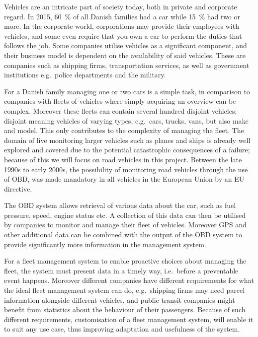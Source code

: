 Vehicles are an intricate part of society today, both in private and corporate regard.
In 2015, 60~\% of all Danish families had a car while 15~\% had two or more\cite{MoreCarsInFamilies}.
In the corporate world, corporations may provide their employees with vehicles,
and some even require that you own a car to perform the duties that follows the job.
Some companies utilise vehicles as a significant component,
and their business model is dependent on the availability of said vehicles.
These are companies such as shipping firms, transportation services,
as well as government institutions e.g.~police departments and the military.

\bigskip
For a Danish family managing one or two cars is a simple task,
in comparison to companies with fleets of vehicles where simply acquiring an overview can be complex.
Moreover these fleets can contain several hundred disjoint vehicles;
disjoint meaning vehicles of varying types, e.g.~cars, trucks, vans, but also make and model.
This only contributes to the complexity of managing the fleet.
The domain of live monitoring larger vehicles such as planes and ships is already well explored and covered
due to the potential catastrophic consequences of a failure;
because of this we will focus on road vehicles in this project.
Between the late 1990s to early 2000s, the possibility of monitoring road vehicles through the use of \ac{OBD},
was made mandatory in all vehicles in the European Union by an EU directive\cite{EUDirective}.

The \ac{OBD} system allows retrieval of various data about the car, such as fuel pressure, speed, engine status etc.
A collection of this data can then be utilised by companies to monitor and manage their fleet of vehicles.
Moreover GPS and other additional data can be combined with the output of the \ac{OBD} system
to provide significantly more information in the management system.

\bigskip
For a fleet management system to enable proactive choices about managing the fleet,
the system must present data in a timely way, i.e.~before a preventable event happens.
Moreover different companies have different requirements for what the ideal fleet management system can do,
e.g.~shipping firms may need parcel information alongside different vehicles,
and public transit companies might benefit from statistics about the behaviour of their passengers.
Because of such different requirements, customisation of a fleet management system,
will enable it to suit any use case, thus improving adaptation and usefulness of the system.

